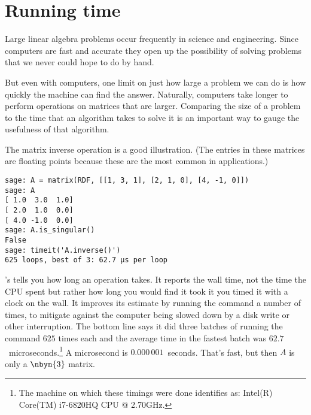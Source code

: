 \section{Running time}
Large linear algebra problems occur frequently in science and
engineering.
Since computers are fast and accurate
they open up the possibility of solving problems
that we never could hope to do by hand.

But even with computers, one limit on just how large a problem we can do is 
how quickly the machine can find the answer.
Naturally, computers take longer to perform operations 
on matrices that are larger.
Comparing the size of a problem to the time that an algorithm takes to 
solve it is an important way to gauge the usefulness of 
that algorithm.

The matrix inverse operation is a good illustration.
(The entries in these matrices are floating points 
because these are the most common in applications.)
\begin{lstlisting}
sage: A = matrix(RDF, [[1, 3, 1], [2, 1, 0], [4, -1, 0]])
sage: A
[ 1.0  3.0  1.0]
[ 2.0  1.0  0.0]
[ 4.0 -1.0  0.0]
sage: A.is_singular()
False
sage: timeit('A.inverse()')
625 loops, best of 3: 62.7 μs per loop
\end{lstlisting}
\Sage's  tells you how long
an operation takes.
It reports the wall time, not the time the CPU
spent but rather how long you would find it took it you timed
it with a clock on the wall.
It improves its estimate by running the command 
a number of times, to mitigate against the
computer being slowed down by a 
disk write or other interruption.
The bottom line says it did three batches of running the command 
$625$ times each and the average time in the fastest batch
was $62.7$~microseconds.\footnote{%
  The machine on which these timings were done
  identifies as: Intel(R) Core(TM) i7-6820HQ CPU @ 2.70GHz.}
A microsecond is 
$0.000\,001$~seconds.
That's fast, but then $A$ is only a $\nbyn{3}$ matrix.

